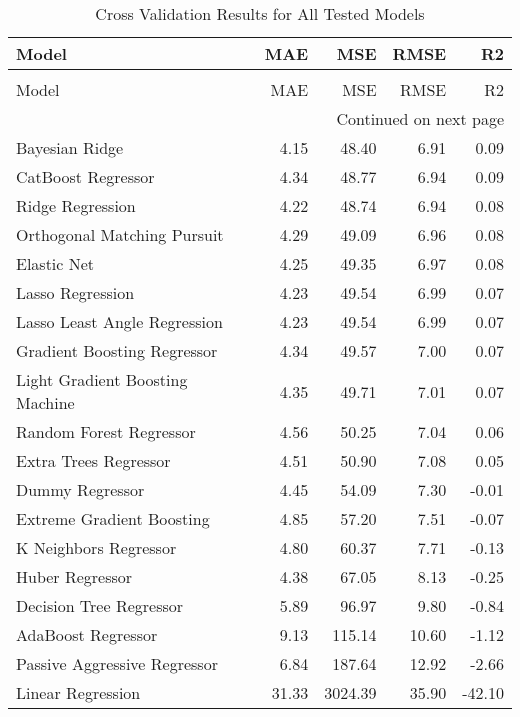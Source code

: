 \begin{longtable}{lrrrr}
\caption{Cross Validation Results for All Tested Models}
\label{tab:cross-validated-results}\\
\toprule
                          Model &   MAE &     MSE &  RMSE &     R2 \\
\midrule
\endfirsthead
\caption[]{Cross Validation Results for All Tested Models} \\
\toprule
                          Model &   MAE &     MSE &  RMSE &     R2 \\
\midrule
\endhead
\midrule
\multicolumn{5}{r}{{Continued on next page}} \\
\midrule
\endfoot

\bottomrule
\endlastfoot
                 Bayesian Ridge &  4.15 &   48.40 &  6.91 &   0.09 \\
             CatBoost Regressor &  4.34 &   48.77 &  6.94 &   0.09 \\
               Ridge Regression &  4.22 &   48.74 &  6.94 &   0.08 \\
    Orthogonal Matching Pursuit &  4.29 &   49.09 &  6.96 &   0.08 \\
                    Elastic Net &  4.25 &   49.35 &  6.97 &   0.08 \\
               Lasso Regression &  4.23 &   49.54 &  6.99 &   0.07 \\
   Lasso Least Angle Regression &  4.23 &   49.54 &  6.99 &   0.07 \\
    Gradient Boosting Regressor &  4.34 &   49.57 &  7.00 &   0.07 \\
Light Gradient Boosting Machine &  4.35 &   49.71 &  7.01 &   0.07 \\
        Random Forest Regressor &  4.56 &   50.25 &  7.04 &   0.06 \\
          Extra Trees Regressor &  4.51 &   50.90 &  7.08 &   0.05 \\
                Dummy Regressor &  4.45 &   54.09 &  7.30 &  -0.01 \\
      Extreme Gradient Boosting &  4.85 &   57.20 &  7.51 &  -0.07 \\
          K Neighbors Regressor &  4.80 &   60.37 &  7.71 &  -0.13 \\
                Huber Regressor &  4.38 &   67.05 &  8.13 &  -0.25 \\
        Decision Tree Regressor &  5.89 &   96.97 &  9.80 &  -0.84 \\
             AdaBoost Regressor &  9.13 &  115.14 & 10.60 &  -1.12 \\
   Passive Aggressive Regressor &  6.84 &  187.64 & 12.92 &  -2.66 \\
              Linear Regression & 31.33 & 3024.39 & 35.90 & -42.10 \\
\end{longtable}
